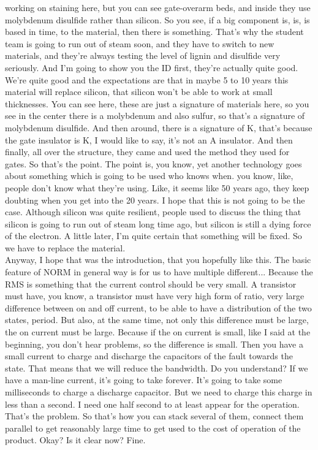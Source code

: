 working on staining here, but you can see gate-overarm beds, and inside they use molybdenum disulfide rather than silicon. So you see, if a big component is, is, is based in time, to the material, then there is something. That's why the student team is going to run out of steam soon, and they have to switch to new materials, and they're always testing the level of lignin and disulfide very seriously. And I'm going to show you the ID first, they're actually quite good. We're quite good and the expectations are that in maybe 5 to 10 years this material will replace silicon, that silicon won't be able to work at small thicknesses. You can see here, these are just a signature of materials here, so you see in the center there is a molybdenum and also sulfur, so that's a signature of molybdenum disulfide. And then around, there is a signature of K, that's because the gate insulator is K, I would like to say, it's not an A insulator. And then finally, all over the structure, they came and used the method they used for gates. So that's the point. The point is, you know, yet another technology goes about something which is going to be used who knows when. you know, like, people don't know what they're using. Like, it seems like 50 years ago, they keep doubting when you get into the 20 years. I hope that this is not going to be the case. Although silicon was quite resilient, people used to discuss the thing that silicon is going to run out of steam long time ago, but silicon is still a dying force of the electron. A little later, I'm quite certain that something will be fixed. So we have to replace the material.\\
Anyway, I hope that was the introduction, that you hopefully like this. The basic feature of NORM in general way is for us to have multiple different... Because the RMS is something that the current control should be very small. A transistor must have, you know, a transistor must have very high form of ratio, very large difference between on and off current, to be able to have a distribution of the two states, period. But also, at the same time, not only this difference must be large, the on current must be large. Because if the on current is small, like I said at the beginning, you don't hear problems, so the difference is small. Then you have a small current to charge and discharge the capacitors of the fault towards the state. That means that we will reduce the bandwidth. Do you understand? If we have a man-line current, it's going to take forever. It's going to take some milliseconds to charge a discharge capacitor. But we need to charge this charge in less than a second. I need one half second to at least appear for the operation. That's the problem. So that's how you can stack several of them, connect them parallel to get reasonably large time to get used to the cost of operation of the product. Okay? Is it clear now? Fine.
